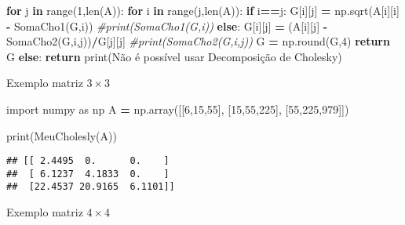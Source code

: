 \documentclass[
]{book}
\newenvironment{Shaded}{\begin{snugshade}}{\end{snugshade}}
\newcommand{\BuiltInTok}[1]{#1}
\newcommand{\CommentTok}[1]{\textcolor[rgb]{0.56,0.35,0.01}{\textit{#1}}}
\newcommand{\ControlFlowTok}[1]{\textcolor[rgb]{0.13,0.29,0.53}{\textbf{#1}}}
\newcommand{\DecValTok}[1]{\textcolor[rgb]{0.00,0.00,0.81}{#1}}
\newcommand{\ImportTok}[1]{#1}
\newcommand{\KeywordTok}[1]{\textcolor[rgb]{0.13,0.29,0.53}{\textbf{#1}}}
\newcommand{\NormalTok}[1]{#1}
\newcommand{\OperatorTok}[1]{\textcolor[rgb]{0.81,0.36,0.00}{\textbf{#1}}}
\newcommand{\StringTok}[1]{\textcolor[rgb]{0.31,0.60,0.02}{#1}}
\begin{document}
\begin{Shaded}
\begin{Highlighting}[]
    \ControlFlowTok{for}\NormalTok{ j }\KeywordTok{in} \BuiltInTok{range}\NormalTok{(}\DecValTok{1}\NormalTok{,}\BuiltInTok{len}\NormalTok{(A)):}
      \ControlFlowTok{for}\NormalTok{ i }\KeywordTok{in} \BuiltInTok{range}\NormalTok{(j,}\BuiltInTok{len}\NormalTok{(A)):}
        \ControlFlowTok{if}\NormalTok{ i}\OperatorTok{==}\NormalTok{j:}
\NormalTok{          G[i][j] }\OperatorTok{=}\NormalTok{ np.sqrt(A[i][i] }\OperatorTok{{-}}\NormalTok{ SomaCho1(G,i))}
          \CommentTok{\#print(SomaCho1(G,i))}
        \ControlFlowTok{else}\NormalTok{:}
\NormalTok{          G[i][j] }\OperatorTok{=}\NormalTok{ (A[i][j] }\OperatorTok{{-}}\NormalTok{ SomaCho2(G,i,j))}\OperatorTok{/}\NormalTok{G[j][j]}
          \CommentTok{\#print(SomaCho2(G,i,j))}
\NormalTok{    G }\OperatorTok{=}\NormalTok{ np.}\BuiltInTok{round}\NormalTok{(G,}\DecValTok{4}\NormalTok{)}
    \ControlFlowTok{return}\NormalTok{ G }
  \ControlFlowTok{else}\NormalTok{:}
    \ControlFlowTok{return} \BuiltInTok{print}\NormalTok{(}\StringTok{\textquotesingle{}Não é possível usar Decomposição de Cholesky\textquotesingle{}}\NormalTok{)}
\end{Highlighting}
\end{Shaded}

Exemplo matriz \(3 \times 3\)

\begin{Shaded}
\begin{Highlighting}[]
\ImportTok{import}\NormalTok{ numpy }\ImportTok{as}\NormalTok{ np}
\NormalTok{A }\OperatorTok{=}\NormalTok{ np.array([[}\DecValTok{6}\NormalTok{,}\DecValTok{15}\NormalTok{,}\DecValTok{55}\NormalTok{],}
\NormalTok{              [}\DecValTok{15}\NormalTok{,}\DecValTok{55}\NormalTok{,}\DecValTok{225}\NormalTok{],}
\NormalTok{              [}\DecValTok{55}\NormalTok{,}\DecValTok{225}\NormalTok{,}\DecValTok{979}\NormalTok{]])}

\BuiltInTok{print}\NormalTok{(MeuCholesly(A))}
\end{Highlighting}
\end{Shaded}

\begin{verbatim}
## [[ 2.4495  0.      0.    ]
##  [ 6.1237  4.1833  0.    ]
##  [22.4537 20.9165  6.1101]]
\end{verbatim}

Exemplo matriz \(4 \times 4\)
\end{document}
